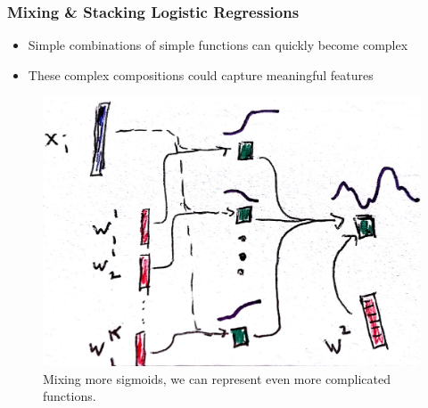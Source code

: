 \documentclass[10pt,mathserif]{beamer}
\begin{document}
\begin{frame}
  \frametitle{Mixing \& Stacking Logistic Regressions}
  \begin{itemize}
  \item Simple combinations of simple functions can quickly become complex
  \item These complex compositions could capture meaningful features
  \end{itemize}
  \begin{figure}
    \centering
    \includegraphics[width=0.55\paperwidth]{figure/mixture_logistic_k}
    \caption{Mixing more sigmoids, we can represent even more complicated
      functions. \label{fig:mixture_logistic_k} }
  \end{figure}
\end{frame}
\end{document}
